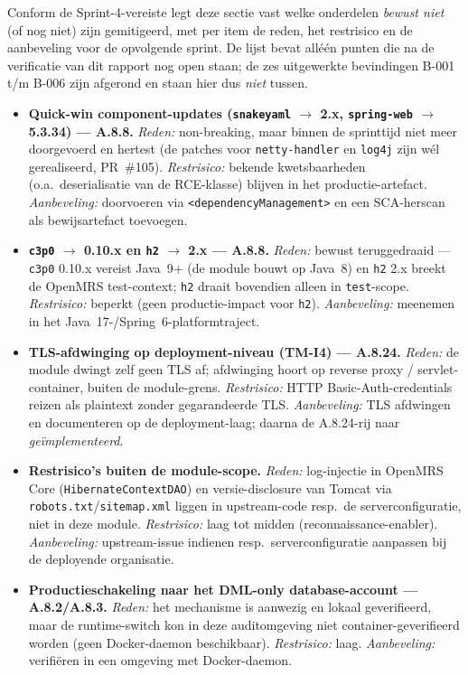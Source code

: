 \documentclass[12pt, a4paper]{report}
\begin{document}
Conform de Sprint-4-vereiste legt deze sectie vast welke onderdelen
\emph{bewust niet} (of nog niet) zijn gemitigeerd, met per item de reden, het
restrisico en de aanbeveling voor de opvolgende sprint. De lijst bevat alléén
punten die na de verificatie van dit rapport nog open staan; de zes uitgewerkte
bevindingen B-001 t/m B-006 zijn afgerond en staan hier dus \emph{niet} tussen.

\begin{itemize}
    \item \textbf{Quick-win component-updates (\texttt{snakeyaml} $\to$ 2.x,
          \texttt{spring-web} $\to$ 5.3.34) --- A.8.8.}
          \emph{Reden:} non-breaking, maar binnen de sprinttijd niet meer
          doorgevoerd en hertest (de patches voor \texttt{netty-handler} en
          \texttt{log4j} zijn wél gerealiseerd, PR~\#105).
          \emph{Restrisico:} bekende kwetsbaarheden (o.a.\ deserialisatie van de
          RCE-klasse) blijven in het productie-artefact.
          \emph{Aanbeveling:} doorvoeren via \texttt{<dependencyManagement>} en
          een SCA-herscan als bewijsartefact toevoegen.
    \item \textbf{\texttt{c3p0} $\to$ 0.10.x en \texttt{h2} $\to$ 2.x --- A.8.8.}
          \emph{Reden:} bewust teruggedraaid --- \texttt{c3p0} 0.10.x vereist
          Java~9+ (de module bouwt op Java~8) en \texttt{h2} 2.x breekt de
          OpenMRS test-context; \texttt{h2} draait bovendien alleen in
          \texttt{test}-scope.
          \emph{Restrisico:} beperkt (geen productie-impact voor \texttt{h2}).
          \emph{Aanbeveling:} meenemen in het Java~17-/Spring~6-platformtraject.
    \item \textbf{TLS-afdwinging op deployment-niveau (TM-I4) --- A.8.24.}
          \emph{Reden:} de module dwingt zelf geen TLS af; afdwinging hoort op
          reverse proxy / servlet-container, buiten de module-grens.
          \emph{Restrisico:} HTTP Basic-Auth-credentials reizen als plaintext
          zonder gegarandeerde TLS.
          \emph{Aanbeveling:} TLS afdwingen en documenteren op de
          deployment-laag; daarna de A.8.24-rij naar \emph{geïmplementeerd}.
    \item \textbf{Restrisico's buiten de module-scope.}
          \emph{Reden:} log-injectie in OpenMRS Core
          (\texttt{HibernateContextDAO}) en versie-disclosure van Tomcat via
          \texttt{robots.txt}/\texttt{sitemap.xml} liggen in upstream-code resp.\
          de serverconfiguratie, niet in deze module.
          \emph{Restrisico:} laag tot midden (reconnaissance-enabler).
          \emph{Aanbeveling:} upstream-issue indienen resp.\ serverconfiguratie
          aanpassen bij de deployende organisatie.
    \item \textbf{Productieschakeling naar het DML-only database-account ---
          A.8.2/A.8.3.}
          \emph{Reden:} het mechanisme is aanwezig en lokaal geverifieerd, maar
          de runtime-switch kon in deze auditomgeving niet
          container-geverifieerd worden (geen Docker-daemon beschikbaar).
          \emph{Restrisico:} laag.
          \emph{Aanbeveling:} verifiëren in een omgeving met Docker-daemon.
\end{itemize}
\end{document}
